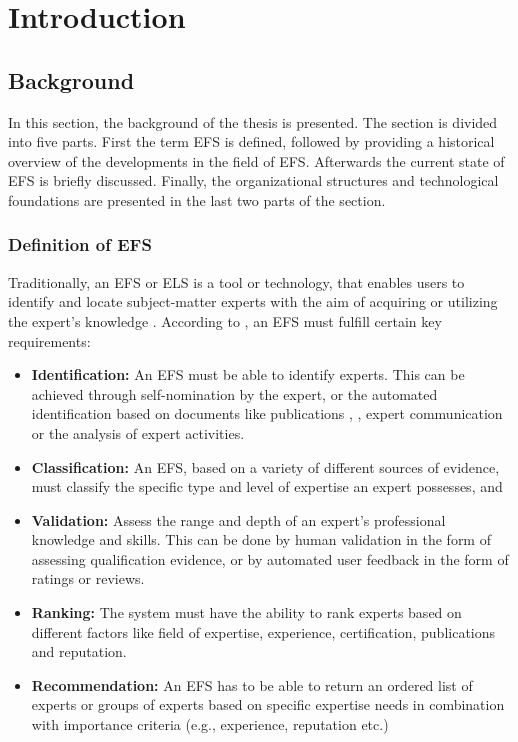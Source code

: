 \newpage
\section{Introduction}

\subsection{Background}
In this section, the background of the thesis is presented. The section is divided into five parts. First the term \ac{EFS} is defined, followed by providing a historical overview of the developments in the field of \ac{EFS}. Afterwards the current state of \ac{EFS} is briefly discussed. Finally, the organizational structures and technological foundations are presented in the last two parts of the section.


\subsubsection{Definition of \ac{EFS}}
Traditionally, an \ac{EFS} or \ac{ELS} is a tool or technology, that enables users to identify and locate subject-matter experts with the aim of acquiring or utilizing the expert’s knowledge \parencite[1]{maybury_expert_2006}. According to \textcite[vii, 3]{maybury_expert_2006}, an \ac{EFS} must fulfill certain key requirements:

\begin{itemize}
    \item \textbf{Identification:} An \ac{EFS} must be able to identify experts. This can be achieved through self-nomination by the expert, or the automated identification based on documents like publications \parencite[vii, 3]{maybury_expert_2006}, \parencite[3]{stankovic_looking_2010}, expert communication or the analysis of expert activities. 
    \item \textbf{Classification:} An \ac{EFS}, based on a variety of different sources of evidence, must classify the specific type and level of expertise an expert possesses, and 
    \item \textbf{Validation:} Assess the range and depth of an expert’s professional knowledge and skills. This can be done by human validation in the form of assessing qualification evidence, or by automated user feedback in the form of ratings or reviews. 
    \item \textbf{Ranking:} The system must have the ability to rank experts based on different factors like field of expertise, experience, certification, publications and reputation.
    \item \textbf{Recommendation:} An \ac{EFS} has to be able to return an ordered list of experts or groups of experts based on specific expertise needs in combination with importance criteria (e.g., experience, reputation etc.)
\end{itemize}

